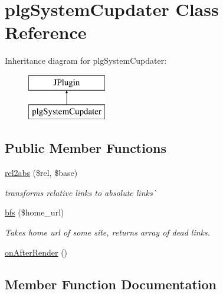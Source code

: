 \hypertarget{classplg_system_cupdater}{}\section{plg\+System\+Cupdater Class Reference}
\label{classplg_system_cupdater}
Inheritance diagram for plg\+System\+Cupdater\+:\begin{figure}[H]
\begin{center}
\leavevmode
\includegraphics[height=2.000000cm]{classplg_system_cupdater}
\end{center}
\end{figure}
\subsection*{Public Member Functions}
\begin{DoxyCompactItemize}
\item 
\mbox{\hyperlink{classplg_system_cupdater_a4e4cea4d20ee382d37b15301ce67d5cb}{rel2abs}} (\$rel, \$base)
\begin{DoxyCompactList}\small\item\em transforms relative links to absolute links\`{} \end{DoxyCompactList}\item 
\mbox{\hyperlink{classplg_system_cupdater_aecad12ea107b61ca641bb25eeb880568}{bfs}} (\$home\+\_\+url)
\begin{DoxyCompactList}\small\item\em Takes home url of some site, returns array of dead links. \end{DoxyCompactList}\item 
\mbox{\hyperlink{classplg_system_cupdater_a2dd6ef9761d5b07ec08554b6042d1263}{on\+After\+Render}} ()
\end{DoxyCompactItemize}


\subsection{Member Function Documentation}
\mbox{\label{classplg_system_cupdater_aecad12ea107b61ca641bb25eeb880568}} 
